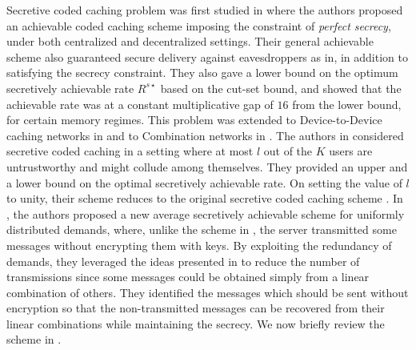 \documentclass[conference]{IEEEtran}
\begin{document}
\par Secretive coded caching problem was first studied in \cite{SecretiveCc,PrivateCc} where the authors proposed an achievable coded caching scheme imposing the constraint of \textit{perfect secrecy}, under both centralized and decentralized settings. Their general achievable scheme also guaranteed secure delivery against eavesdroppers as in\cite{SecureDelivCc}, in addition to satisfying the secrecy constraint. They also gave a lower bound on the optimum secretively achievable rate $R^{s\star}$ based on the cut-set bound, and showed that the achievable rate was at a constant multiplicative gap of $16$ from the lower bound, for certain memory regimes. This problem was extended to Device-to-Device caching networks in \cite{D2DSecureCc} and to Combination networks in \cite{SecCombi}. The authors in \cite{SecretiveCollud} considered secretive coded caching in a setting where at most $l$ out of the $K$ users are untrustworthy and might collude among themselves. They provided an upper and a lower bound on the optimal secretively achievable rate. On setting the value of $l$ to unity, their scheme reduces to the original secretive coded caching scheme \cite{PrivateCc}. In \cite{ImprovedSecretiveCc}, the authors proposed a new average secretively achievable scheme for uniformly distributed demands, where, unlike the scheme in \cite{PrivateCc}, the server transmitted some messages without encrypting them with keys. By exploiting the redundancy of demands, they leveraged the ideas presented in \cite{YMACc} to reduce the number of transmissions since some messages could be obtained simply from a linear combination of others. They identified the messages which should be sent without encryption so that the non-transmitted messages can be recovered from their linear combinations while maintaining the secrecy. We now briefly review the scheme in \cite{PrivateCc}.
\end{document}
